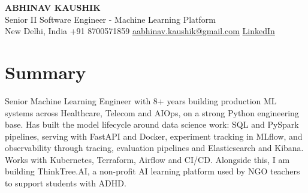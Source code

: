 \documentclass[10pt,a4paper]{article}
\begin{document}
\begin{center}
  {\LARGE\bfseries ABHINAV KAUSHIK}\\[2pt]
  {\large Senior II Software Engineer - Machine Learning Platform}\\[2pt]
  New Delhi, India \textbar{} +91 8700571859 \textbar{} \href{mailto:aabhinav.kaushik@gmail.com}{aabhinav.kaushik@gmail.com} \textbar{} \href{https://www.linkedin.com/in/abhinav-kaushik10/}{LinkedIn}  
\end{center}

\section{Summary}
Senior Machine Learning Engineer with 8+ years building production ML systems across Healthcare, Telecom and AIOps, on a strong Python engineering base. Has built the model lifecycle around data science work: SQL and PySpark pipelines, serving with FastAPI and Docker, experiment tracking in MLflow, and observability through tracing, evaluation pipelines and Elasticsearch and Kibana. Works with Kubernetes, Terraform, Airflow and CI/CD. Alongside this, I am building ThinkTree.AI, a non-profit AI learning platform used by NGO teachers to support students with ADHD.
\end{document}
